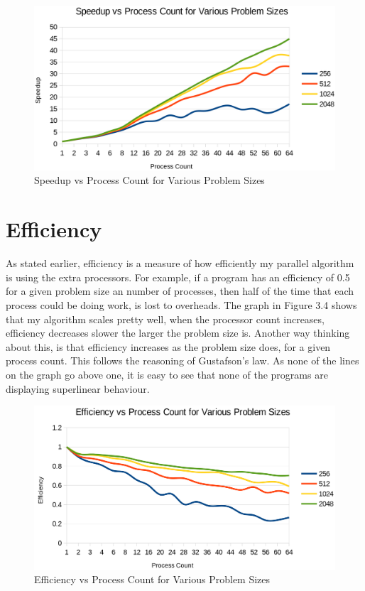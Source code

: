 \documentclass{report}
\begin{document}
\begin{figure}[h]
\includegraphics[width=1\textwidth]{Speedup}
\caption{Speedup vs Process Count for Various Problem Sizes}
\label{fig:subim3}
\end{figure}


\section{Efficiency}
As stated earlier, efficiency is a measure of how efficiently my parallel algorithm is using the extra processors. For example, if a program has an efficiency of 0.5 for a given problem size an number of processes, then half of the time that each process could be doing work, is lost to overheads. The graph in Figure 3.4 shows that my algorithm scales pretty well, when the processor count increases, efficiency decreases slower the larger the problem size is. Another way thinking about this, is that efficiency increases as the problem size does, for a given process count. This follows the reasoning of Gustafson's law. As none of the lines on the graph go above one, it is easy to see that none of the programs are displaying superlinear behaviour.

\begin{figure}[h]
\includegraphics[width=1\textwidth]{Efficiency}
\caption{Efficiency vs Process Count for Various Problem Sizes}
\label{fig:subim3}
\end{figure}
\end{document}
